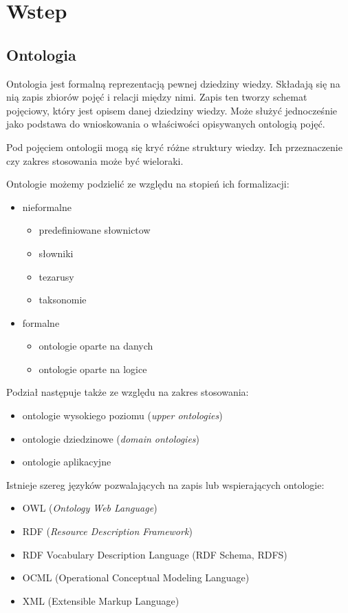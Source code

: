 \section{Wstep}
\label{cha:wstep}

\subsection{Ontologia}
\label{sec:ont}

Ontologia jest formalną reprezentacją pewnej dziedziny wiedzy. Składają się na nią zapis zbiorów pojęć i relacji między nimi. Zapis ten tworzy schemat pojęciowy, który jest opisem danej dziedziny wiedzy. Może służyć jednocześnie jako podstawa do wnioskowania o właściwości opisywanych ontologią pojęć.	

Pod pojęciem ontologii mogą się kryć różne struktury wiedzy. Ich przeznaczenie czy zakres stosowania może być wieloraki.

Ontologie możemy podzielić ze względu na stopień ich formalizacji:
\begin{itemize}
\item nieformalne
	\begin{itemize}
		\item predefiniowane słownictow
		\item słowniki
		\item tezarusy
		\item taksonomie
	\end{itemize}
\item formalne
	\begin{itemize}
		\item ontologie oparte na danych
		\item ontologie oparte na logice
	\end{itemize}
\end{itemize}

Podział następuje także ze względu na zakres stosowania:
\begin{itemize}
\item ontologie wysokiego poziomu (\textit{upper ontologies})
\item ontologie dziedzinowe (\textit{domain ontologies})
\item ontologie aplikacyjne
\end{itemize}

Istnieje szereg języków pozwalających na zapis lub wspierających ontologie:
\begin{itemize}
\item OWL (\textit{Ontology Web Language})
\item RDF (\textit{Resource Description Framework})
\item RDF Vocabulary Description Language (RDF Schema, RDFS)
\item OCML (Operational Conceptual Modeling Language)
\item XML (Extensible Markup Language)
\end{itemize}

